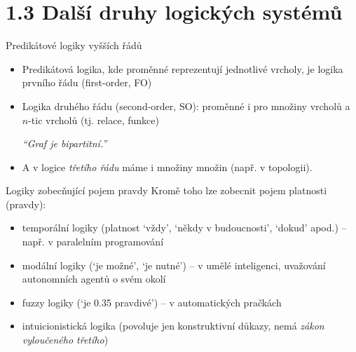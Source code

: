 \documentclass{beamer}
\begin{document}
\section{1.3 Další druhy logických systémů}


\begin{frame}{Predikátové logiky vyšších řádů}

    \begin{itemize}[<+->]
        \item Predikátová logika, kde proměnné reprezentují jednotlivé vrcholy, je logika \alert{prvního řádu} (\alert{first-order}, \alert{FO})
        \item Logika \alert{druhého řádu} (\alert{second-order}, \alert{SO}): proměnné i pro množiny vrcholů a $n$-tic vrcholů (tj. relace, funkce)
        \bigskip

        \pause
        \pause    
        \begin{center}
            \it ``Graf je bipartitní.''
        \end{center}  

        \pause
        \medskip
        \item A v logice \emph{třetího řádu} máme i množiny množin (např. v topologii).
    \end{itemize}

\end{frame}


\begin{frame}{Logiky zobecňující pojem pravdy}
    Kromě toho lze zobecnit pojem platnosti (pravdy):
    
    \begin{itemize}[<+->]     
        \item \alert{temporální logiky} (platnost `vždy', `někdy v budoucnosti', `dokud' apod.) -- např. v paralelním programování
        \item \alert{modální logiky} (`je možné', `je nutné') -- v umělé inteligenci, uvažování autonomních agentů o svém okolí
        \item \alert{fuzzy logiky} (`je 0.35 pravdivé') -- v automatických pračkách
        \item \alert{intuicionistická logika} (povoluje jen konstruktivní důkazy, nemá \emph{zákon vyloučeného třetího})
    \end{itemize}
\end{frame}
\end{document}

